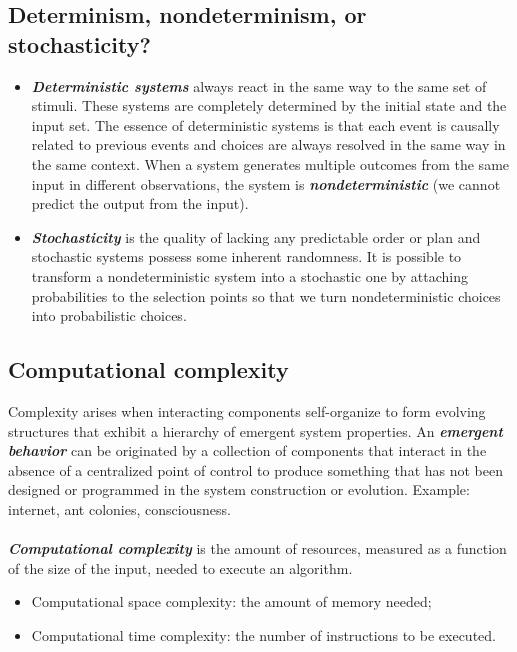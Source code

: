 \subsection{Determinism, nondeterminism, or stochasticity?}

\begin{itemize}
\item
  \textbf{\emph{Deterministic systems}} always react in the same way to
  the same set of stimuli. These systems are completely determined by
  the initial state and the input set. The essence of deterministic
  systems is that each event is causally related to previous events and
  choices are always resolved in the same way in the same context. When
  a system generates multiple outcomes from the same input in different
  observations, the system is \textbf{\emph{nondeterministic}} (we
  cannot predict the output from the input).
\item
  \textbf{\emph{Stochasticity}} is the quality of lacking any
  predictable order or plan and stochastic systems possess some inherent
  randomness. It is possible to transform a nondeterministic system into
  a stochastic one by attaching probabilities to the selection points so
  that we turn nondeterministic choices into probabilistic choices.
\end{itemize}


\subsection{Computational complexity}

Complexity arises when interacting components self-organize to form
evolving structures that exhibit a hierarchy of emergent system
properties. An \textbf{\emph{emergent behavior}} can be originated by a
collection of components that interact in the absence of a centralized
point of control to produce something that has not been designed or
programmed in the system construction or evolution. Example: internet,
ant colonies, consciousness.\\
\\
\noindent
\textbf{\emph{Computational complexity}} is the amount of resources,
measured as a function of the size of the input, needed to execute an
algorithm.

\begin{itemize}
\tightlist
\item
  Computational space complexity: the amount of memory needed;
\item
  Computational time complexity: the number of instructions to be
  executed.
\end{itemize}


